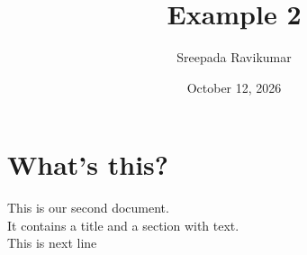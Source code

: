 \documentclass[a4paper,12pt]{article}
\begin{document}
\title{Example 2}
\author{ Sreepada Ravikumar}
\date{October 12, 2026}
\maketitle

\section{What's this?}
This is our second document. \\It contains a title and a section 
with text.\\
This is next line
\end{document}
